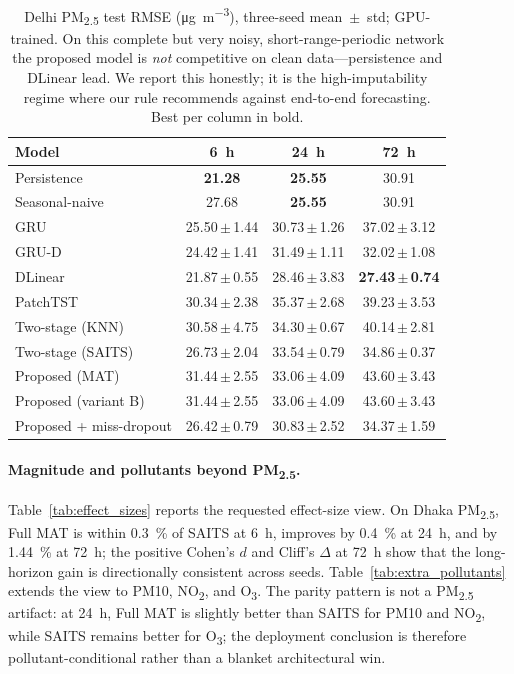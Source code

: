 \documentclass[review,3p,times]{elsarticle}
\newcommand{\ugm}{\si{\micro\gram\per\cubic\metre}}
\newcommand{\pmf}{PM\textsubscript{2.5}}
\begin{document}
\begin{table}[t]
\centering
\caption{Delhi \pmf{} test RMSE (\ugm), three-seed mean~$\pm$~std; GPU-trained.
On this complete but very noisy, short-range-periodic network the proposed model
is \emph{not} competitive on clean data---persistence and DLinear lead. We report
this honestly; it is the high-imputability regime where our rule recommends
against end-to-end forecasting. Best per column in bold.}
\label{tab:delhi}
\small
\begin{tabular}{lccc}
\toprule
Model & \SI{6}{\hour} & \SI{24}{\hour} & \SI{72}{\hour} \\
\midrule
Persistence            & \textbf{21.28} & \textbf{25.55} & 30.91 \\
Seasonal-naive         & 27.68 & \textbf{25.55} & 30.91 \\
GRU                    & 25.50\,$\pm$\,1.44 & 30.73\,$\pm$\,1.26 & 37.02\,$\pm$\,3.12 \\
GRU-D                  & 24.42\,$\pm$\,1.41 & 31.49\,$\pm$\,1.11 & 32.02\,$\pm$\,1.08 \\
DLinear                & 21.87\,$\pm$\,0.55 & 28.46\,$\pm$\,3.83 & \textbf{27.43\,$\pm$\,0.74} \\
PatchTST               & 30.34\,$\pm$\,2.38 & 35.37\,$\pm$\,2.68 & 39.23\,$\pm$\,3.53 \\
Two-stage (KNN)        & 30.58\,$\pm$\,4.75 & 34.30\,$\pm$\,0.67 & 40.14\,$\pm$\,2.81 \\
Two-stage (SAITS)      & 26.73\,$\pm$\,2.04 & 33.54\,$\pm$\,0.79 & 34.86\,$\pm$\,0.37 \\
Proposed (MAT)         & 31.44\,$\pm$\,2.55 & 33.06\,$\pm$\,4.09 & 43.60\,$\pm$\,3.43 \\
Proposed (variant B)   & 31.44\,$\pm$\,2.55 & 33.06\,$\pm$\,4.09 & 43.60\,$\pm$\,3.43 \\
Proposed + miss-dropout& 26.42\,$\pm$\,0.79 & 30.83\,$\pm$\,2.52 & 34.37\,$\pm$\,1.59 \\
\bottomrule
\end{tabular}
\end{table}

\paragraph{Magnitude and pollutants beyond \pmf.}
Table~\ref{tab:effect_sizes} reports the requested effect-size view. On Dhaka
\pmf{}, Full MAT is within \SI{0.3}{\percent} of SAITS at \SI{6}{\hour},
improves by \SI{0.4}{\percent} at \SI{24}{\hour}, and by
\SI{1.44}{\percent} at \SI{72}{\hour}; the positive Cohen's $d$ and Cliff's
$\Delta$ at \SI{72}{\hour} show that the long-horizon gain is directionally
consistent across seeds. Table~\ref{tab:extra_pollutants} extends the view to
PM10, NO\textsubscript{2}, and O\textsubscript{3}. The parity pattern is not a
\pmf{} artifact: at \SI{24}{\hour}, Full MAT is slightly better than SAITS for
PM10 and NO\textsubscript{2}, while SAITS remains better for
O\textsubscript{3}; the deployment conclusion is therefore pollutant-conditional
rather than a blanket architectural win.
\end{document}
